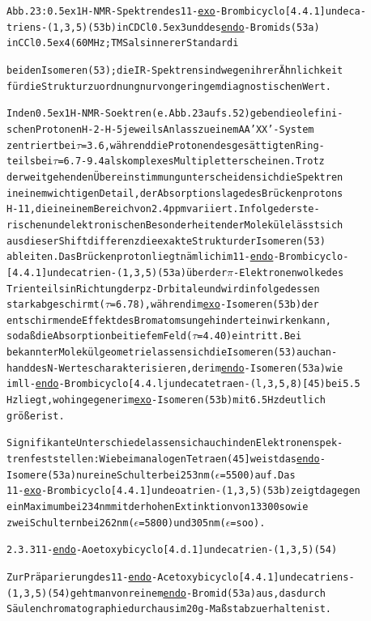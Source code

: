 \documentclass[a4paper,11pt]{article}
\begin{document}
\begin{alltt}
Abb. 23: \raise0.5ex\hbox{1}H-NMR-Spektren des 11-\underline{exo}-Brombicyclo[4.4.1]undeca-
triens-(1,3,5) (53b) in CDCl\lower0.5ex\hbox{3} und des \underline{endo}-Bromids (53a)
in CCl\lower0.5ex\hbox{4} (60 MHz; TMS als innerer Standardi
\newpage
{}


beiden Isomeren (53); die IR-Spektren sind wegen ihrer Ähnlichkeit
für die Strukturzuordnung nur von geringem diagnostischen Wert.

In den \raise0.5ex\hbox{1}H-NMR-Soektren (e. Abb. 23 auf s. 52) geben die olefini-
schen Protonen H-2 - H-5 jeweils Anlass zu einem AA'XX'-System
zentriert bei \(\tau\) = 3.6, während die Protonen des gesättigten Ring-
teils bei \(\tau\) = 6.7 - 9.4 als komplexes Multiplett erscheinen. Trotz
der weitgehenden Übereinstimmung unterscheiden sich die Spektren
in einem wichtigen Detail, der Absorptionslage des Brückenprotons
H-11‚ die in einem Bereich von 2.4 ppm variiert. Infolge der ste-
rischen und elektronischen Besonderheiten der Moleküle lässt sich
aus dieser Shiftdifferenz die exakte Struktur der Isomeren (53)
ableiten. Das Brückenproton liegt nämlich im 11-\underline{endo}-Brombicyclo-
[4.4.1]undecatrien-(1‚3,5) (53a) über der \(\pi\)-Elektronenwolke des
Trienteils in Richtung der pz-Drbitale und wird infolgedessen
stark abgeschirmt (\(\tau\) = 6.78), während im \underline{exo}-Isomeren (53b) der
entschirmende Effekt des Bromatoms ungehindert einwirken kann,
so daß die Absorption bei tiefem Feld (\(\tau\) = 4.40) eintritt. Bei
bekannter Molekülgeometrie lassen sich die Isomeren (53) auch an-
hand des N-Wertes charakterisieren, der im \underline{endo}-Isomeren (53a) wie
im ll-\underline{endo}-Brombicyclo[4.4.ljundecatetraen-(l‚3,5,8) [45) bei 5.5
Hz liegt, wohingegen er im \underline{exo}-Isomeren (53b) mit 6.5 Hz deutlich
größer ist.

Signifikante Unterschiede lassen sich auch in den Elektronenspek-
tren feststellen: Wie beim analogen Tetraen (45] weist das \underline{endo}-
Isomere (53a) nur eine Schulter bei 253 nm (\(\epsilon\) = 5500) auf. Das
11-\underline{exo}-Brombicyclo[4.4.1]undeoatrien-(1‚3,5) (53b) zeigt dagegen
ein Maximum bei 234 nm mit der hohen Extinktion von 13300 sowie
zwei Schultern bei 262 nm (\(\epsilon\) = 5800) und 305 nm (\(\epsilon\) = soo).


2.3.3 11-\underline{endo}-Aoetoxybicyclo[4.d.1]undecatrien-(1‚3,5) (54)

Zur Präparierung des 11-\underline{endo}-Acetoxybicyclo[4.4.1]undecatriens-
(1,3‚5) (54) geht man von reinem \underline{endo}-Bromid (53a) aus, das durch
Säulenchromatographie durchaus im 20 g - Maßstab zu erhalten ist.


\end{alltt}
\end{document}
